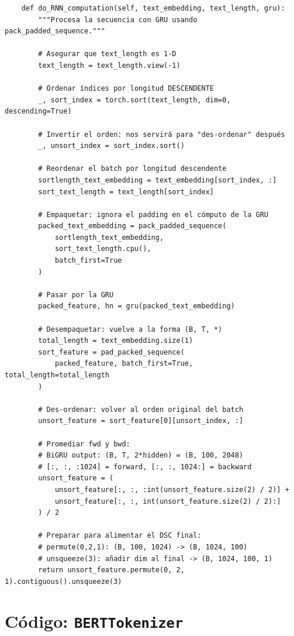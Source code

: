 \begin{verbatim}
    def do_RNN_computation(self, text_embedding, text_length, gru):
        """Procesa la secuencia con GRU usando pack_padded_sequence."""

        # Asegurar que text_length es 1-D
        text_length = text_length.view(-1)

        # Ordenar índices por longitud DESCENDENTE
        _, sort_index = torch.sort(text_length, dim=0, descending=True)

        # Invertir el orden: nos servirá para "des-ordenar" después
        _, unsort_index = sort_index.sort()

        # Reordenar el batch por longitud descendente
        sortlength_text_embedding = text_embedding[sort_index, :]
        sort_text_length = text_length[sort_index]

        # Empaquetar: ignora el padding en el cómputo de la GRU
        packed_text_embedding = pack_padded_sequence(
            sortlength_text_embedding,
            sort_text_length.cpu(),
            batch_first=True
        )

        # Pasar por la GRU
        packed_feature, hn = gru(packed_text_embedding)

        # Desempaquetar: vuelve a la forma (B, T, *)
        total_length = text_embedding.size(1)
        sort_feature = pad_packed_sequence(
            packed_feature, batch_first=True, total_length=total_length
        )

        # Des-ordenar: volver al orden original del batch
        unsort_feature = sort_feature[0][unsort_index, :]

        # Promediar fwd y bwd:
        # BiGRU output: (B, T, 2*hidden) = (B, 100, 2048)
        # [:, :, :1024] = forward, [:, :, 1024:] = backward
        unsort_feature = (
            unsort_feature[:, :, :int(unsort_feature.size(2) / 2)] +
            unsort_feature[:, :, int(unsort_feature.size(2) / 2):]
        ) / 2

        # Preparar para alimentar el DSC final:
        # permute(0,2,1): (B, 100, 1024) -> (B, 1024, 100)
        # unsqueeze(3): añadir dim al final -> (B, 1024, 100, 1)
        return unsort_feature.permute(0, 2, 1).contiguous().unsqueeze(3)
\end{verbatim}

\section{Código: \texttt{BERTTokenizer}}

